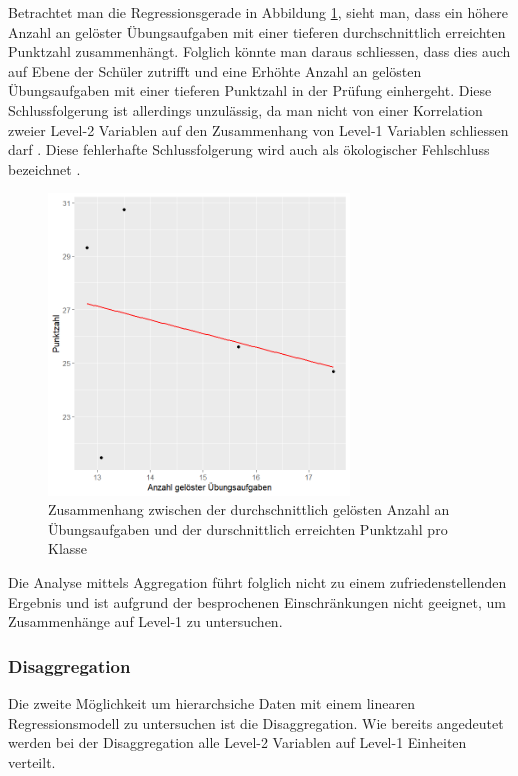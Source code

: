 \documentclass[12pt]{article}\usepackage[]{graphicx}\usepackage[]{color}
\begin{document}
Betrachtet man die Regressionsgerade in Abbildung \ref{fig:aggregiert}, sieht man, dass ein höhere Anzahl an gelöster Übungsaufgaben mit einer tieferen durchschnittlich erreichten Punktzahl zusammenhängt. Folglich könnte man daraus schliessen, dass dies auch auf Ebene der Schüler zutrifft und eine Erhöhte Anzahl an gelösten Übungsaufgaben mit einer tieferen Punktzahl in der Prüfung einhergeht. Diese Schlussfolgerung ist allerdings unzulässig, da man nicht von einer Korrelation zweier Level-2 Variablen auf den Zusammenhang von Level-1 Variablen schliessen darf \citep{SnijdersTomA.B2012Ma:a}.  Diese fehlerhafte Schlussfolgerung wird auch als ökologischer Fehlschluss bezeichnet \citep{robinson2009ecological}.

\begin{figure}[b!]
\centering
\captionsetup{width=8cm}
\includegraphics[width = 8cm, height = 8cm]{aggregation}
\caption{Zusammenhang zwischen der durchschnittlich gelösten Anzahl an Übungsaufgaben und der durschnittlich erreichten Punktzahl pro Klasse}
\label{fig:aggregiert}
\end{figure}

Die Analyse mittels Aggregation führt folglich nicht zu einem zufriedenstellenden Ergebnis und ist aufgrund der besprochenen Einschränkungen nicht geeignet, um Zusammenhänge auf Level-1 zu untersuchen.

\subsubsection{Disaggregation} \label{section:disaggregation}
Die zweite Möglichkeit um hierarchsiche Daten mit einem linearen Regressionsmodell zu untersuchen ist die Disaggregation. Wie bereits angedeutet werden bei der Disaggregation alle Level-2 Variablen auf Level-1 Einheiten verteilt. 
\end{document}
